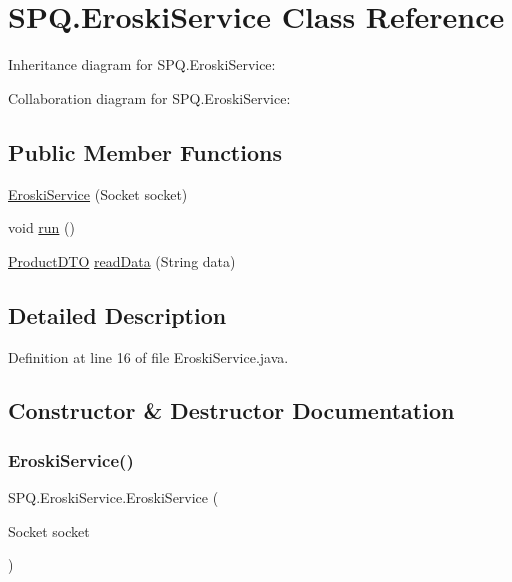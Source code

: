 \hypertarget{class_s_p_q_1_1_eroski_service}{}\section{S\+P\+Q.\+Eroski\+Service Class Reference}
\label{class_s_p_q_1_1_eroski_service}


Inheritance diagram for S\+P\+Q.\+Eroski\+Service\+:


Collaboration diagram for S\+P\+Q.\+Eroski\+Service\+:
\subsection*{Public Member Functions}
\begin{DoxyCompactItemize}
\item 
\mbox{\hyperlink{class_s_p_q_1_1_eroski_service_a89b9137c5a6ba87692037a4b0bc2b14e}{Eroski\+Service}} (Socket socket)
\item 
void \mbox{\hyperlink{class_s_p_q_1_1_eroski_service_abacda123f2febc1eb7c2825eb4e46c37}{run}} ()
\item 
\mbox{\hyperlink{class_s_p_q_1_1dto_1_1_product_d_t_o}{Product\+D\+TO}} \mbox{\hyperlink{class_s_p_q_1_1_eroski_service_a89fa3f97cdca647e3c6d6606e5dc2443}{read\+Data}} (String data)
\end{DoxyCompactItemize}


\subsection{Detailed Description}


Definition at line 16 of file Eroski\+Service.\+java.



\subsection{Constructor \& Destructor Documentation}
\mbox{\label{class_s_p_q_1_1_eroski_service_a89b9137c5a6ba87692037a4b0bc2b14e}} 
\subsubsection{\texorpdfstring{Eroski\+Service()}{EroskiService()}}
{\footnotesize\ttfamily S\+P\+Q.\+Eroski\+Service.\+Eroski\+Service (\begin{DoxyParamCaption}\item[{Socket}]{socket }\end{DoxyParamCaption})}



